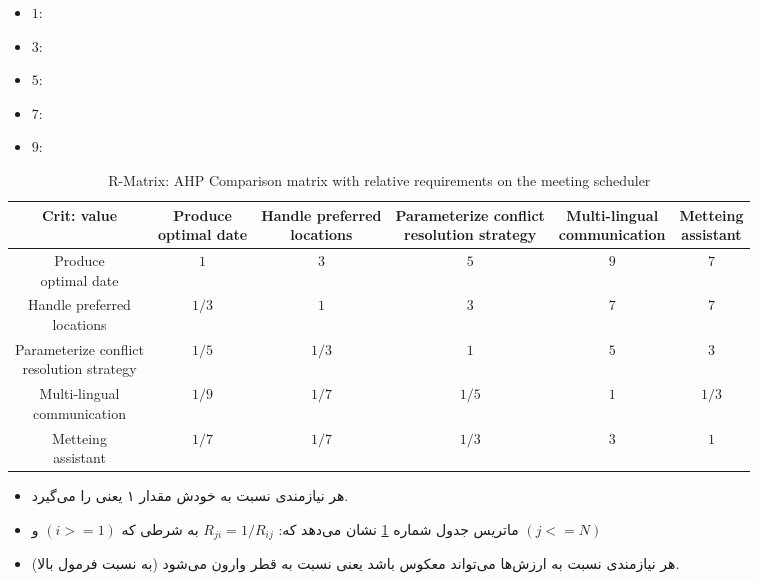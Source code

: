 \begin{LTR}
    \begin{itemize}
        \item $1$: 
        \item $3$: 
        \item $5$: 
        \item $7$: 
        \item $9$: 
    \end{itemize}

    \begin{table}[H]
        \centering
        \begin{tabular}{cccccc}
            Crit: value & \makecell{Produce \\ optimal date} & \makecell{Handle preferred \\ locations} & \makecell{Parameterize conflict \\ resolution strategy} & \makecell{Multi-lingual \\ communication} & \makecell{Metteing \\ assistant} \\ \hline
            \makecell{Produce \\ optimal date} & $1$ & $3$ & $5$ & $9$ & $7$ \\ \hline
            \makecell{Handle preferred \\ locations} & $1/3$ & $1$ & $3$ & $7$ & $7$  \\ \hline
            \makecell{Parameterize conflict \\ resolution strategy} & $1/5$ & $1/3$ & $1$ & $5$ & $3$ \\ \hline
            \makecell{Multi-lingual \\ communication} & $1/9$ & $1/7$ & $1/5$ & $1$ & $1/3$ \\ \hline
            \makecell{Metteing \\ assistant} & $1/7$ & $1/7$ & $1/3$ & $3$ & $1$ \\
        \end{tabular}
        \caption{R-Matrix: AHP Comparison matrix with relative requirements on
        the meeting scheduler}
        \label{fig:ahpValueComparison}
    \end{table}
\end{LTR}

\begin{itemize}
    \item هر نیازمندی نسبت به خودش مقدار ۱ یعنی  را
    می‌گیرد.
    \item ماتریس جدول شماره \ref{fig:ahpValueComparison} نشان می‌دهد که: $R_{ji} = 1
    / R_{ij}$ به شرطی که $(i >= 1)$ و $(j <= N)$
    \item هر نیازمندی نسبت به ارزش‌ها می‌تواند معکوس باشد یعنی نسبت به قطر وارون
    می‌شود (به نسبت فرمول بالا).
\end{itemize}

